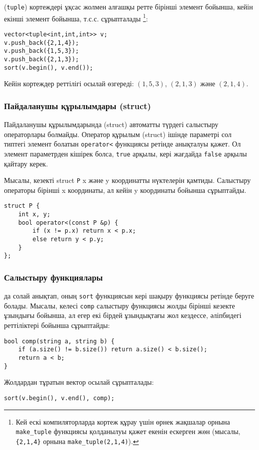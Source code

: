 
(\texttt{tuple}) кортеждері ұқсас жолмен 
алғашқы ретте бірінші элемент бойынша, кейін
екінші элемент бойынша, т.с.с. сұрыпталады 
\footnote{Кей ескі компиляторларда кортеж  
құрау үшін өрнек жақшалар орнына \texttt{make\_tuple}
функциясы қолданылуы қажет екенін ескерген жөн
(мысалы, \texttt{\{2,1,4\}} орнына 
\texttt{make\_tuple(2,1,4)}).}:
\begin{lstlisting}
vector<tuple<int,int,int>> v;
v.push_back({2,1,4});
v.push_back({1,5,3});
v.push_back({2,1,3});
sort(v.begin(), v.end());
\end{lstlisting}
Кейін кортеждер реттілігі осылай өзгереді:
$(1,5,3)$, $(2,1,3)$ және $(2,1,4)$.


\subsubsection{Пайдаланушы құрылымдары (struct)}

Пайдаланушы құрылымдарында (struct) автоматты түрдегі 
салыстыру операторлары болмайды.
Оператор құрылым (struct) ішінде параметрі сол типтегі 
элемент болатын \texttt{operator<} 
функциясы ретінде анықталуы қажет.
Ол элемент параметрден кішірек болса, \texttt{true} арқылы, 
кері жағдайда \texttt{false} арқылы қайтару керек.

Мысалы, кезекті struct \texttt{P}
x және y координатты нүктелерін қамтиды.
Салыстыру операторы бірінші x координаты,
ал кейін y координаты бойынша сұрыптайды.

\begin{lstlisting}
struct P {
    int x, y;
    bool operator<(const P &p) {
        if (x != p.x) return x < p.x;
        else return y < p.y;
    }
};
\end{lstlisting}

\subsubsection{Салыстыру функциялары}


 да солай анықтап, 
оның \texttt{sort} функциясын кері шақыру функциясы ретінде беруге болады.
Мысалы, келесі \texttt{comp} салыстыру функциясы 
жолды бірінші кезекте ұзындығы бойынша, ал егер екі
бірдей ұзындықтағы жол кездессе, әліпбидегі реттіліктері
бойынша сұрыптайды:

\begin{lstlisting}
bool comp(string a, string b) {
    if (a.size() != b.size()) return a.size() < b.size();
    return a < b;
}
\end{lstlisting}
Жолдардан тұратын вектор осылай сұрыпталады:
\begin{lstlisting}
sort(v.begin(), v.end(), comp);
\end{lstlisting}

